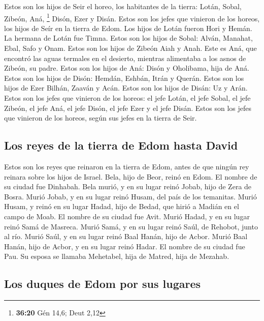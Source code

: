 \begin{paracol}{2}
 Estos son los hijos de Seir el horeo, los habitantes de
la tierra: Lotán, Sobal, Zibeón, Aná, \footnote{\textbf{36:20} Gén 14,6;
  Deut 2,12}  Disón, Ezer y Disán. Estos son los jefes
que vinieron de los horeos, los hijos de Seír en la tierra de Edom.
 Los hijos de Lotán fueron Hori y Hemán. La hermana de
Lotán fue Timna.  Estos son los hijos de Sobal: Alván,
Manahat, Ebal, Safo y Onam.  Estos son los hijos de
Zibeón Aiah y Anah. Este es Aná, que encontró las aguas termales en el
desierto, mientras alimentaba a los asnos de Zibeón, su padre.
 Estos son los hijos de Aná: Disón y Oholibama, hija de
Aná.  Estos son los hijos de Disón: Hemdán, Eshbán, Itrán
y Querán.  Estos son los hijos de Ezer Bilhán, Zaaván y
Acán.  Estos son los hijos de Disán: Uz y Arán.
 Estos son los jefes que vinieron de los horeos: el jefe
Lotán, el jefe Sobal, el jefe Zibeón, el jefe Aná,  el
jefe Disón, el jefe Ezer y el jefe Disán. Estos son los jefes que
vinieron de los horeos, según sus jefes en la tierra de Seir.

\hypertarget{los-reyes-de-la-tierra-de-edom-hasta-david}{%
\subsection{Los reyes de la tierra de Edom hasta
David}\label{los-reyes-de-la-tierra-de-edom-hasta-david}}

 Estos son los reyes que reinaron en la tierra de Edom,
antes de que ningún rey reinara sobre los hijos de Israel.
 Bela, hijo de Beor, reinó en Edom. El nombre de su
ciudad fue Dinhabah.  Bela murió, y en su lugar reinó
Jobab, hijo de Zera de Bosra.  Murió Jobab, y en su lugar
reinó Husam, del país de los temanitas.  Murió Husam, y
reinó en su lugar Hadad, hijo de Bedad, que hirió a Madián en el campo
de Moab. El nombre de su ciudad fue Avit.  Murió Hadad, y
en su lugar reinó Samá de Masreca.  Murió Samá, y en su
lugar reinó Saúl, de Rehobot, junto al río.  Murió Saúl,
y en su lugar reinó Baal Hanán, hijo de Acbor.  Murió
Baal Hanán, hijo de Acbor, y en su lugar reinó Hadar. El nombre de su
ciudad fue Pau. Su esposa se llamaba Mehetabel, hija de Matred, hija de
Mezahab.

\hypertarget{los-duques-de-edom-por-sus-lugares}{%
\subsection{Los duques de Edom por sus
lugares}\label{los-duques-de-edom-por-sus-lugares}}


\end{paracol}
